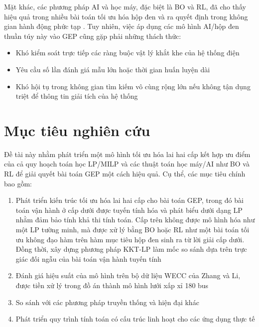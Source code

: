 Mặt khác, các phương pháp AI và học máy, đặc biệt là BO và RL, đã cho thấy hiệu quả trong nhiều bài toán tối ưu hóa hộp đen và ra quyết định trong không gian hành động phức tạp \cite{shahriari2016bo_survey,sutton2018rl,schulman2017ppo}. Tuy nhiên, việc áp dụng các mô hình AI/hộp đen thuần túy này vào GEP cũng gặp phải những thách thức:

\begin{itemize}
    \item Khó kiểm soát trực tiếp các ràng buộc vật lý khắt khe của hệ thống điện
    \item Yêu cầu số lần đánh giá mẫu lớn hoặc thời gian huấn luyện dài
    \item Khó hội tụ trong không gian tìm kiếm vô cùng rộng lớn nếu không tận dụng triệt để thông tin giải tích của hệ thống
\end{itemize}

\section{Mục tiêu nghiên cứu}

Đề tài này nhằm phát triển một mô hình tối ưu hóa lai hai cấp kết hợp ưu điểm của cả quy hoạch toán học LP/MILP và các thuật toán học máy/AI như BO và RL để giải quyết bài toán GEP một cách hiệu quả. Cụ thể, các mục tiêu chính bao gồm:

\begin{enumerate}
    \item Phát triển kiến trúc tối ưu hóa lai hai cấp cho bài toán GEP, trong đó bài toán vận hành ở cấp dưới được tuyến tính hóa và phát biểu dưới dạng LP nhằm đảm bảo tính khả thi tính toán. Cấp trên không được mô hình hóa như một LP tường minh, mà được xử lý bằng BO hoặc RL như một bài toán tối ưu không đạo hàm trên hàm mục tiêu hộp đen sinh ra từ lời giải cấp dưới. Đồng thời, xây dựng phương pháp KKT-LP làm mốc so sánh dựa trên trực giác đối ngẫu của bài toán vận hành tuyến tính \cite{shahriari2016bo_survey,sutton2018rl}
    \item Đánh giá hiệu suất của mô hình trên bộ dữ liệu WECC của Zhang và Li, được tiền xử lý trong đồ án thành mô hình lưới xấp xỉ 180 bus \cite{zhang2023dataset}
    \item So sánh với các phương pháp truyền thống và hiện đại khác
    \item Phát triển quy trình tính toán có cấu trúc linh hoạt cho các ứng dụng thực tế
\end{enumerate}

